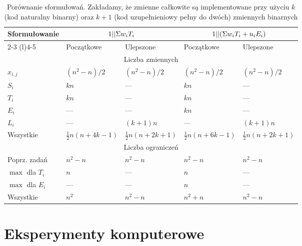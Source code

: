 \begin{table}[!ht]
\renewcommand{\arraystretch}{1.5}
\caption{Porównanie sformułowań. Zakładamy, że zmienne całkowite są implementowane przy użyciu $k$ (kod naturalny binarny) oraz $k+1$ (kod uzupełnieniowy pełny do dwóch) zmiennych binarnych}\label{tab:formulations}
\begin{tabularx}{\columnwidth}{lXXXX}
\toprule
\multirow{2}{*}{Sformułowanie\phantom{aa}} & \multicolumn{2}{c}{$1||\Sigma{}w_i T_i$} & \multicolumn{2}{c}{$1||(\Sigma{}w_i T_i+u_i E_i)$} \\ \cmidrule(r){2-3} \cmidrule(l){4-5}
 & Początkowe  & Ulepszone  & Początkowe  & Ulepszone  \\ \midrule
\multicolumn{5}{c}{Liczba zmiennych} \\ \midrule
$x_{i,j}$ & $(n^2-n)/2$ & $(n^2-n)/2$ & $(n^2-n)/2$ & $(n^2-n)/2$ \\
$S_i$ & $kn$ & --- & $kn$ & --- \\
$T_i$ & $kn$ & --- & $kn$ & --- \\
$E_i$ & --- & --- & $kn$ & --- \\
$L_i$ & --- & $(k+1)n$ & --- & $(k+1)n$ \\ \midrule
Wszystkie & $\frac{1}2n(n+4k-1)$ & $\frac{1}2n(n+2k+1)$ & $\frac{1}2n(n+6k-1)$ & $\frac{1}2n(n+2k+1)$ \\ \midrule
\multicolumn{5}{c}{Liczba ograniczeń} \\ \midrule
Poprz. zadań & $n^2-n$ & $n^2-n$ & $n^2-n$ & $n^2-n$ \\
$\max$ dla $T_i$ & $n$ & --- & $n$ & --- \\
$\max$ dla $E_i$ & --- & --- & $n$ & --- \\ \midrule
Wszystkie & $n^2$ & $n^2-n$ & $n^2+n$ & $n^2-n$ \\
\bottomrule
\end{tabularx}
\renewcommand{\arraystretch}{1.0}
\end{table}
\section{Eksperymenty komputerowe}

